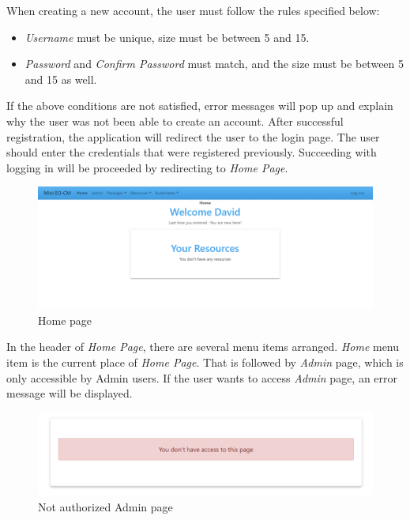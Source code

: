 When creating a new account, the user must follow the rules specified below:
\begin{itemize}
  \item \emph{Username} must be unique, size must be between 5 and 15.
  \item \emph{Password} and \emph{Confirm Password} must match, and the size must be between 5 and 15 as well.
\end{itemize}

If the above conditions are not satisfied, error messages will pop up and explain why the user was not been able to create an account. After successful registration, the application will redirect the user to the login page. The user should enter the credentials that were registered previously. Succeeding with logging in will be proceeded by redirecting to \emph{Home Page}.

\begin{figure}[H]
	\centering
	\includegraphics[width=\textwidth]{images/main-1.png}
	\caption{Home page}
	\label{ssec:figure-for-home-page}
\end{figure}

In the header of \emph{Home Page}, there are several menu items arranged. \emph{Home} menu item is the current place of \emph{Home Page}. That is followed by \emph{Admin} page, which is only accessible by Admin users. If the user wants to access \emph{Admin} page, an error message will be displayed.

\begin{figure}[H]
	\centering
	\includegraphics[width=\textwidth]{images/admin-error.png}
	\caption{Not authorized Admin page}
	\label{ssec:admin-authorization}
\end{figure}

